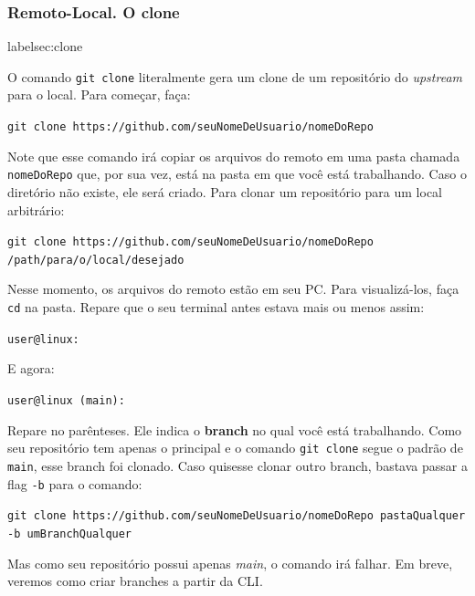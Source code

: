 \documentclass{article}
\begin{document}
  \subsubsection{Remoto-Local. O clone}
  label{sec:clone}

  O comando \texttt{git clone} literalmente gera um clone de um repositório do \textit{upstream} para o local. Para começar, faça:
  
  \vspace{1ex}
  \texttt{git clone https://github.com/seuNomeDeUsuario/nomeDoRepo}
  \vspace{1ex}
  
  Note que esse comando irá copiar os arquivos do remoto em uma pasta chamada \texttt{nomeDoRepo} que, por sua vez, está na pasta
  em que você está trabalhando. Caso o diretório não existe, ele será criado. Para clonar um repositório para um local arbitrário: 

  \vspace{1ex}
  \texttt{git clone https://github.com/seuNomeDeUsuario/nomeDoRepo /path/para/o/local/desejado}
  \vspace{1ex}

  Nesse momento, os arquivos do remoto estão em seu PC. Para visualizá-los, faça \texttt{cd} na pasta. Repare que o seu terminal 
  antes estava mais ou menos assim:

  \vspace{1ex}
  \texttt{user@linux: ~}
  \vspace{1ex}

  E agora: 

  \vspace{1ex}
  \texttt{user@linux (main): ~}
  \vspace{1ex}

  Repare no parênteses. Ele indica o \textbf{branch} no qual você está trabalhando. Como seu repositório tem apenas o principal e o 
  comando \texttt{git clone} segue o padrão de \texttt{main}, esse branch foi clonado. Caso quisesse clonar outro branch, bastava
  passar a flag \texttt{-b} para o comando: 

  \vspace{1ex}
  \texttt{git clone https://github.com/seuNomeDeUsuario/nomeDoRepo pastaQualquer -b umBranchQualquer}
  \vspace{1ex}

  Mas como seu repositório possui apenas \textit{main}, o comando irá falhar. Em breve, veremos como criar branches a partir da CLI.
\end{document}
